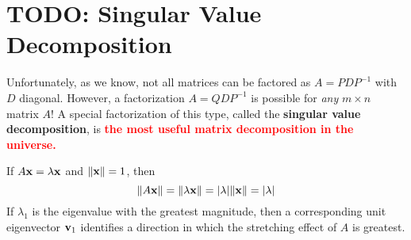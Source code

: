     \section{TODO: Singular Value Decomposition}
    Unfortunately, as we know, not all matrices can be factored as $A = PDP^{-1}$ with $D$ diagonal. However, a factorization $A = QDP^{-1}$ is possible for \textit{any} $m\times n$ matrix $A$! A special factorization of this type, called the \textbf{singular value decomposition}, is \textbf{\textcolor{red}{the most useful matrix decomposition in the universe.}} \par
    If $A\mathbf{x} = \lambda \mathbf{x}$ and $\lVert \mathbf{x} \rVert = 1$, then
    \begin{equation*}
        \lVert A\mathbf{x} \rVert = \lVert \lambda \mathbf{x} \rVert = |\lambda| \lVert \mathbf{x} \rVert = |\lambda|
    \end{equation*} If $\lambda_1$ is the eigenvalue with the greatest magnitude, then a corresponding unit eigenvector $\mathbf{v}_1$ identifies a direction in which the stretching effect of $A$ is greatest.

